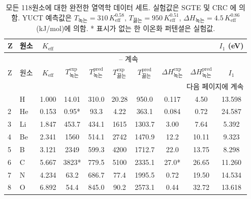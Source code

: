 \documentclass[11pt,a4paper]{article}
\begin{document}
	\setlength{\tabcolsep}{3pt}
	\begin{longtable}{@{}llcccccccc@{}}
		\caption{모든 118원소에 대한 완전한 열역학 데이터 세트.  
			실험값은 SGTE \cite{Dinsdale1991} 및 CRC \cite{CRC}에 의함.  
			YUCT 예측값은 \(T_{\text{녹는}} = 310\,K_{\mathrm{eff}}^{0.58}\),  
			\(T_{\text{끓는}} = 950\,K_{\mathrm{eff}}^{0.51}\),  
			\(\Delta H_{\text{녹는}} = 4.5\,K_{\mathrm{eff}}^{0.86}\) (kJ/mol)에 의함.  
			* 표시가 없는 한 이온화 퍼텐셜은 실험값.}
		\label{tab:full_118}\\
		\toprule
		Z & 원소 & \(K_{\mathrm{eff}}\) & 
		\makebox[1.5cm]{\(T_{\text{녹는}}^{\text{exp}}\) (K)} & 
		\makebox[1.5cm]{\(T_{\text{녹는}}^{\text{pred}}\) (K)} &
		\makebox[1.5cm]{\(T_{\text{끓는}}^{\text{exp}}\) (K)} & 
		\makebox[1.5cm]{\(T_{\text{끓는}}^{\text{pred}}\) (K)} &
		\makebox[1.5cm]{\(\Delta H_{\text{녹는}}^{\text{exp}}\) (kJ/mol)} & 
		\makebox[1.5cm]{\(\Delta H_{\text{녹는}}^{\text{pred}}\) (kJ/mol)} &
		\(I_1\) (eV) \\
		\midrule
		\endfirsthead
		\multicolumn{10}{c}{\tablename\ \thetable{} -- 계속} \\
		\toprule
		Z & 원소 & \(K_{\mathrm{eff}}\) & \(T_{\text{녹는}}^{\text{exp}}\) & \(T_{\text{녹는}}^{\text{pred}}\) &
		\(T_{\text{끓는}}^{\text{exp}}\) & \(T_{\text{끓는}}^{\text{pred}}\) & \(\Delta H_{\text{녹는}}^{\text{exp}}\) & \(\Delta H_{\text{녹는}}^{\text{pred}}\) & \(I_1\) \\
		\midrule
		\endhead
		\bottomrule
		\multicolumn{10}{r}{다음 페이지에 계속} \\
		\endfoot
		\endlastfoot
		1  & H   & 1.000 & 14.01  & 310.0  & 20.28  & 950.0  & 0.117 & 4.50  & 13.598 \\
		2  & He  & 0.153 & 0.95*  & 93.3   & 4.22   & 363.1  & 0.084 & 0.72  & 24.587 \\
		3  & Li  & 1.847 & 453.7  & 434.1  & 1615   & 1303.7 & 3.00  & 7.64  & 5.392 \\
		4  & Be  & 2.341 & 1560   & 514.1  & 2742   & 1470.9 & 12.2  & 10.11 & 9.323 \\
		5  & B   & 3.121 & 2349   & 599.3  & 4200   & 1712.7 & 22.0  & 13.75 & 8.298 \\
		6  & C   & 5.667 & 3823*  & 779.5  & 5100   & 2335.1 & 27.0* & 26.65 & 11.260 \\
		7  & N   & 4.234 & 63.2   & 686.7  & 77.4   & 1995.5 & 0.72  & 19.50 & 14.534 \\
		8  & O   & 6.892 & 54.4   & 845.0  & 90.2   & 2573.1 & 0.44  & 32.72 & 13.618 \\

\end{longtable}
\end{document}
